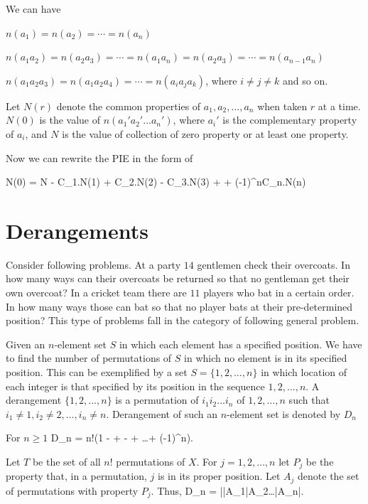 We can have

\startitemize[n]
\item $n(a_1) = n(a_2) = \cdots = n(a_n)$
\item $n(a_1a_2) = n(a_2a_3) = \cdots = n(a_1a_n) = n(a_2a_3) = \cdots = n(a_{n - 1}a_n)$
\item $n(a_1a_2a_3) = n(a_1a_2a_4) = \cdots = n(a_ia_ja_k)$, where $i\neq j\neq k$
\stopitemize
and so on.

Let $N(r)$ denote the common properties of $a_1, a_2, \ldots, a_n$ when taken $r$ at a time. $N(0)$ is the
value of $n(a_1'a_2'\ldots a_n')$, where $a_i'$ is the complementary property of $a_i$, and $N$ is the value
of collection of zero property or at least one property.

Now we can rewrite the PIE in the form of

\startformula
  N(0) = N - C_1^^nN(1) + C_2^^nN(2) - C_3^^nN(3) + \cdots + (-1)^nC_n^^nN(n)
\stopformula
\section{Derangements}
Consider following problems. At a party $14$ gentlemen check their overcoats. In how many ways can their overcoats be returned so
that no gentleman get their own overcoat? In a cricket team there are $11$ players who bat in a certain order. In how many ways
those can bat so that no player bats at their pre-determined position? This type of problems fall in the category of following
general problem.

Given an $n$-element set $S$ in which each element has a specified position. We have to find the number of permutations of $S$ in
which no element is in its specified position. This can be exemplified by a set $S = \{1, 2, \ldots, n\}$ in which location of each
integer is that specified by its position in the sequence $1, 2, \ldots, n$. A derangement $\{1, 2, \ldots, n\}$ is a permutation
of $i_1i_2\ldots i_n$ of $1, 2, \ldots, n$ such that $i_1\neq 1, i_2\neq 2, \ldots, i_n\neq n$. Derangement of such an $n$-element
set is denoted by $D_n$

For $n\geq 1$ \startformula D_n = n!\left(1 -  +  -  + \ldots + (-1)^n\right).\stopformula

Let $T$ be the set of all $n!$ permutations of $X$. For $j = 1, 2, \ldots, n$ let $P_j$ be the property that, in a permutation, $j$
is in its proper position. Let $A_j$ denote the set of permutations with property $P_j$. Thus, \startformula D_n = |\bar{A_1}\cap\bar{A_2}\cap\ldots\cap\bar{A_n}|.\stopformula

